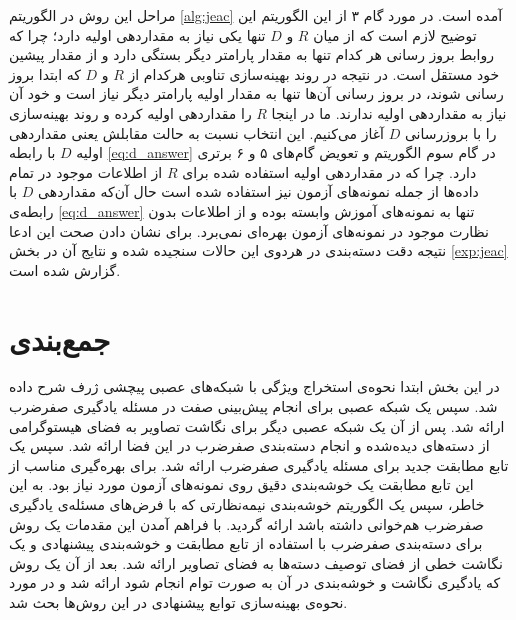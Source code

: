 مراحل این روش در الگوریتم \ref{alg:jeac} آمده است. در مورد گام ۳ از این الگوریتم این توضیح لازم است که از میان $R$ و $D$ تنها یکی نیاز به مقداردهی اولیه دارد؛ چرا که روابط بروز رسانی هر کدام تنها به مقدار پارامتر دیگر بستگی دارد و از مقدار پیشین خود مستقل است. در نتیجه در روند بهینه‌سازی تناوبی هرکدام از $R$ و $D$ که ابتدا بروز رسانی شوند، در بروز رسانی آن‌ها تنها به مقدار اولیه پارامتر دیگر نیاز است و خود آن نیاز به مقداردهی اولیه ندارند. ما در اینجا $R$ را مقداردهی اولیه کرده و روند بهینه‌سازی را با بروزرسانی $D$ آغاز می‌کنیم. این انتخاب نسبت به حالت مقابلش یعنی مقداردهی اولیه $D$ با رابطه
\eqref{eq:d_answer}
 در گام سوم الگوریتم و تعویض گام‌های ۵ و ۶ برتری دارد. چرا که در مقداردهی اولیه استفاده شده برای $R$ از اطلاعات موجود در تمام داده‌ها از جمله نمونه‌های آزمون نیز استفاده شده است حال آن‌که مقداردهی $D$ با رابطه‌ی \eqref{eq:d_answer} تنها به نمونه‌های آموزش وابسته بوده و از اطلاعات بدون نظارت موجود در نمونه‌های آزمون بهره‌ای نمی‌برد. برای نشان دادن صحت این ادعا نتیجه دقت دسته‌بندی در هردوی این حالات سنجیده شده و نتایج آن در بخش  \ref{exp:jeac} گزارش شده است.
\section{جمع‌بندی}
در این بخش ابتدا نحوه‌ی استخراج ویژگی با شبکه‌های عصبی پیچشی ژرف شرح داده شد. سپس یک شبکه عصبی برای انجام پیش‌بینی صفت در مسئله یادگیری صفرضرب ارائه شد. پس از آن یک شبکه عصبی دیگر برای نگاشت تصاویر به فضای هیستوگرامی از دسته‌های دیده‌شده و انجام دسته‌بندی صفرضرب در این فضا ارائه شد. سپس  یک تابع مطابقت جدید برای مسئله یادگیری صفرضرب ارائه شد. برای بهره‌گیری مناسب از این تابع مطابقت یک خوشه‌بندی دقیق روی نمونه‌های آزمون مورد نیاز بود. به این خاطر، سپس یک الگوریتم خوشه‌بندی نیمه‌نظارتی که با فرض‌های مسئله‌ی یادگیری صفرضرب هم‌خوانی داشته باشد ارائه گردید. با فراهم آمدن این مقدمات یک روش برای دسته‌بندی صفرضرب با استفاده از تابع مطابقت و خوشه‌بندی پیشنهادی و یک نگاشت خطی از فضای توصیف دسته‌ها به فضای تصاویر ارائه شد. بعد از آن یک روش که یادگیری نگاشت و خوشه‌بندی در آن  به صورت توام انجام شود ارائه شد و در مورد نحوه‌ی بهینه‌سازی توابع پیشنهادی در این روش‌ها بحث شد.
